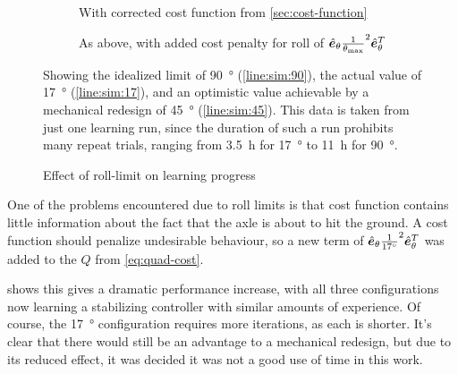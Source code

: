 \documentclass[main.tex]{subfiles}
\begin{document}
	\begin{figure}[b!]
		\centering
		\begin{subfigure}[t]{\linewidth}
			\begin{minipage}{0.5\linewidth - 2em}
				
			\end{minipage}\hfill
			\begin{minipage}{0.5\linewidth - 2em}
				
			\end{minipage}
			\caption{With corrected cost function from \cref{sec:cost-function}}
			\label{fig:roll:progress:prev}
		\end{subfigure}
		\par\bigskip
		\begin{subfigure}[t]{\linewidth}
			\begin{minipage}{0.5\linewidth - 2em}
				
			\end{minipage}\hfill
			\begin{minipage}{0.5\linewidth - 2em}
				
			\end{minipage}
			\caption{As above, with added cost penalty for roll of $\hat{\bm{e}}_{\theta}\frac{1}{\theta_{\mathrm{max}}}^2\hat{\bm{e}}_{\theta}^T$}
			\label{fig:roll:progress:fixed}
		\end{subfigure}
		\caption{Effect of roll-limit on learning progress}
		\label{fig:roll:progress}
		\medskip
		\small
		Showing the idealized limit of \SI{90}{\degree} (\ref{line:sim:90}), the actual value of \SI{17}{\degree} (\ref{line:sim:17}), and an optimistic value achievable by a mechanical redesign of \SI{45}{\degree} (\ref{line:sim:45}).
		This data is taken from just one learning run, since the duration of such a run prohibits many repeat trials, ranging from \SI{3.5}{\hour} for \SI{17}{\degree} to \SI{11}{\hour} for \SI{90}{\degree}.
	\end{figure}

	One of the problems encountered due to roll limits is that cost function contains little information about the fact that the axle is about to hit the ground.
	A cost function should penalize undesirable behaviour, so a new term of $\hat{\bm{e}}_{\theta}\frac{1}{\SI{17}{\degree}}^2\hat{\bm{e}}_{\theta}^T$ was added to the $Q$ from \cref{eq:quad-cost}.

	 shows this gives a dramatic performance increase, with all three configurations now learning a stabilizing controller with similar amounts of experience.
	Of course, the \SI{17}{\degree} configuration requires more iterations, as each is shorter.
	It's clear that there would still be an advantage to a mechanical redesign, but due to its reduced effect, it was decided it was not a good use of time in this work.

	\bib
\end{document}
